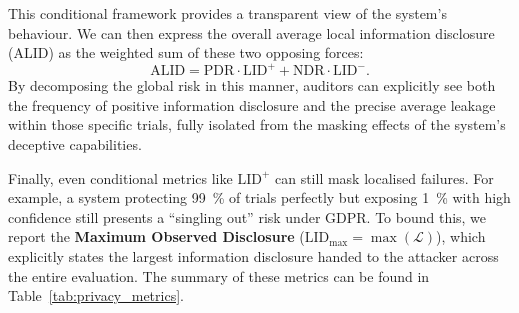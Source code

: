 This conditional framework provides a transparent view of the system's behaviour. We can then express the overall average local information disclosure (ALID) as the weighted sum of these two opposing forces:
\begin{equation}
    \mathrm{ALID} = \mathrm{PDR} \cdot \mathrm{LID}^+ + \mathrm{NDR} \cdot \mathrm{LID}^-.\end{equation}
By decomposing the global risk in this manner, auditors can explicitly see both the frequency of positive information disclosure and the precise average leakage within those specific trials, fully isolated from the masking effects of the system's deceptive capabilities.




Finally, even conditional metrics like $\mathrm{LID}^+$ can still mask localised failures. For example,  a system protecting \qty{99}{\percent} of trials perfectly but exposing \qty{1}{\percent} with high confidence still presents a ``singling out'' risk under GDPR. To bound this, we report the \textbf{Maximum Observed Disclosure} ($\mathrm{LID}_{\text{max}} = \max(\mathcal{L})$), which explicitly states the largest information disclosure handed to the attacker across the entire evaluation. The summary of these metrics can be found in Table~\ref{tab:privacy_metrics}. 

